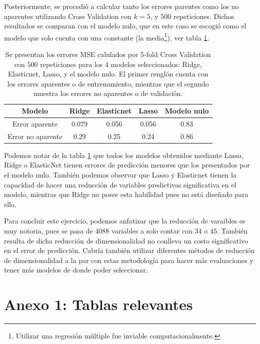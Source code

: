 \documentclass[11pt]{article}
\begin{document}
Posteriormente, se procedió a calcular tanto los errores parentes como los no aparentes utilizando Cross Validation con $k=5$, y $500$ repeticiones. Dichos resultados se comparan con el modelo nulo, que en este caso se escogió como el modelo que solo cuenta con una constante (la media\footnote{Utilizar una regresión múltiple fue inviable computacionalmente.}), ver tabla \ref{tabla:ME}.  \\

\begin{table}[htbp]
\begin{center}
\begin{tabular}{|c|c|c|c|c|}
\hline
Modelo     &  Ridge & Elasticnet &  Lasso  &  Modelo nulo  \\ \hline \hline
Error aparente    & 0.079 & 0.056 & 0.056 &  0.83  \\ \hline
Error no aparente & 0.29  & 0.25  & 0.24  &  0.86   \\ \hline
\end{tabular}
\caption{Se presentan los errores MSE calulados por 5-fold Cross Validation con $500$ repeticiones para los 4 modelos seleccionados: Ridge, Elasticnet, Lasso, y el modelo nulo. El primer renglón cuenta con los errores aparentes o de entrenamiento, mientras que el segundo muestra los errores no aparentes o de validación.}
\label{tabla:ME}
\end{center}
\end{table}

Podemos notar de la tabla \ref{tabla:ME} que todos los modelos obtenidos mediante Lasso, Ridge o ElasticNet tienen errores de predicción menores que los presentados por el modelo nulo. También podemos observar que Lasso y Elasticnet tienen la capacidad de hacer una reducción de variables predictivas significativa en el modelo, mientras que Ridge no posee esta habilidad pues no está diseñado para ello.

Para concluir este ejercicio, podemos anfatizar que la reducción de varaibles es muy notoria, pues se pasa de $4088$ variables a solo contar con $34$ o $45$. También resulta de dicha reducción de dimensionalidad no conlleva un costo significativo en el error de predicción. Cabría también utilizar diferentes métodos de reducción de dimensionalidad a la par con estas metodología para hacer más evaluaciones y tener más modelos de donde poder seleccionar.



\pagebreak
\section*{Anexo 1: Tablas relevantes}
\end{document}
